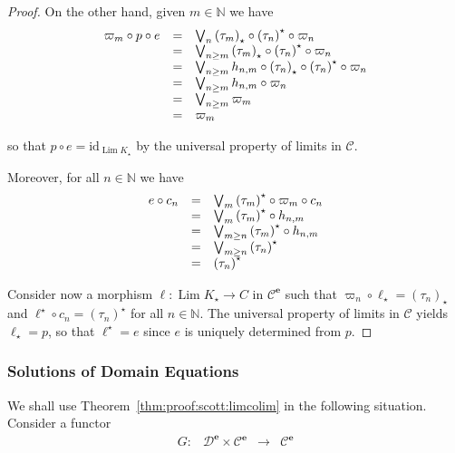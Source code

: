 \documentclass[%
  a4paper,
  UKenglish,
  cleveref,
  autoref,
  thm-restate,
  numberwithinsect,
]{lipics-v2021}
\newcommand\longto\longrightarrow
\newcommand\NN{\mathbb{N}}
\newcommand\cat\mathcal
\newcommand\comp{\mathbin\circ}
\newcommand\id{\mathrm{id}}
\newcommand\ladj[1]{\ensuremath{{#1}^{\star}}}	%
\newcommand\radj[1]{\ensuremath{{#1}_{\star}}}	%
\newcommand\Lim{\mathop{\mathrm{Lim}}}
\newcommand\ep{{\mathbf{e}}}
\begin{document}
\begin{proof}
\noindent
On the other hand, given $m \in \NN$ we have
\[
\begin{array}{l l l}
  \varpi_m \comp p \comp e
& =
& \bigvee_{n} \radj{(\tau_m)} \comp \ladj{(\tau_n)} \comp \varpi_n
\\
%
& =
& \bigvee_{n \geq m} \radj{(\tau_m)} \comp \ladj{(\tau_n)} \comp \varpi_n
\\
%
& =
& \bigvee_{n \geq m} h_{n,m} \comp \radj{(\tau_n)} \comp \ladj{(\tau_n)} \comp \varpi_n
\\
%
& =
& \bigvee_{n \geq m} h_{n,m} \comp \varpi_n
\\
%
& =
& \bigvee_{n \geq m} \varpi_m
\\
%
& =
& \varpi_m
\end{array}
\]

\noindent
so that $p \comp e = \id_{\Lim \radj K}$
by the universal property of limits in $\cat C$.

Moreover, for all $n \in \NN$ we have
\[
\begin{array}{l l l}
  e \comp c_n
& =
& \bigvee_m \ladj{(\tau_m)} \comp \varpi_m \comp c_n
\\
%
& =
& \bigvee_m \ladj{(\tau_m)} \comp h_{n,m}
\\
%
& =
& \bigvee_{m\geq n} \ladj{(\tau_m)} \comp h_{n,m}
\\
%
& =
& \bigvee_{m\geq n} \ladj{(\tau_n)}
\\
%
& =
& \ladj{(\tau_n)}
\end{array}
\]

Consider now a morphism $\ell \colon \Lim \radj K \to C$
in $\cat C^\ep$
such that 
$\varpi_n \comp \radj\ell = \radj{(\tau_n)}$
and
$\ladj\ell \comp c_n = \ladj{(\tau_n)}$
for all $n \in \NN$.
The universal property of limits in $\cat C$
yields $\radj\ell = p$, so that $\ladj\ell = e$
since $e$ is uniquely determined from $p$.
\end{proof}


\subsubsection{Solutions of Domain Equations}
We shall use Theorem~\ref{thm:proof:scott:limcolim}
in the following situation.
Consider a functor
\[
\begin{array}{*{4}{l}}
  G \colon
& \cat D^\ep \times \cat C^\ep
& \longto
& \cat C^\ep
\end{array}
\]
\end{document}

